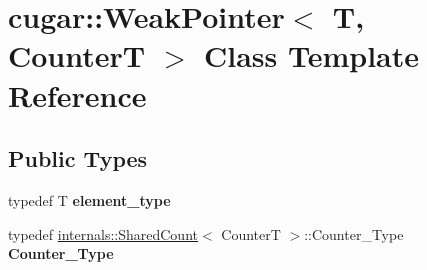 \hypertarget{classcugar_1_1_weak_pointer}{}\section{cugar\+:\+:Weak\+Pointer$<$ T, CounterT $>$ Class Template Reference}
\label{classcugar_1_1_weak_pointer}
\subsection*{Public Types}
\begin{DoxyCompactItemize}
\item 
\mbox{\label{classcugar_1_1_weak_pointer_ac0e868d8e0818f36b32f187e0ba98aff}} 
typedef T {\bfseries element\+\_\+type}
\item 
\mbox{\label{classcugar_1_1_weak_pointer_af921b1265878f3fda683072de5ff5336}} 
typedef \hyperlink{classcugar_1_1internals_1_1_shared_count}{internals\+::\+Shared\+Count}$<$ CounterT $>$\+::Counter\+\_\+\+Type {\bfseries Counter\+\_\+\+Type}
\end{DoxyCompactItemize}
